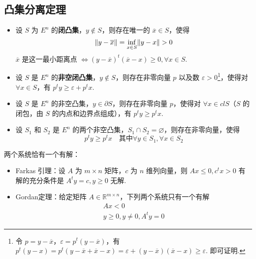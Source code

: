\subsection{凸集分离定理}
\begin{theorem}[凸集分离定理]
    \text{}
    \begin{itemize}
        \item 设 $S$ 为 $E^n$ 的\textbf{闭凸集}，$y\notin S$，则存在唯一的 $\overline{x} \in S$，使得\[ \norm{y - \overline{x}} = \underset{x \in S}{\inf} \norm{y - x} > 0 \]
        $\overline{x}$ 是这一最小距离点 $\Longleftrightarrow (y - \overline{x})^t(\overline{x} - x) \ge 0, \forall x \in S$.

        \item 设 $S$ 是 $E^n$ 的\textbf{非空闭凸集}，$y\notin S$，则存在非零向量 $p$ 以及数 $\varepsilon > 0$\footnote{令 $p = y - \overline{x}$，$\varepsilon = p^t(y - \overline{x})$，有 $p^t(y - x) = p^t(y - \overline{x} + \overline{x} - x) = \varepsilon + (y - \overline{x})(\overline{x} - x) \ge \varepsilon$. 即可证明.}，使得对 $\forall x \in S$，有 $p^t y \ge \varepsilon + p^t x$.
        
        \item 设 $S$ 是 $E^n$ 的非空凸集，$y\in \partial S$，则存在非零向量 $p$，使得对 $\forall x \in clS$（$S$ 的闭包，由 $S$ 的内点和边界点组成），有 $p^ty \ge p^tx$.
        
        \item 设 $S_1$ 和 $S_2$ 是 $E^n$ 的两个非空凸集，$S_1 \cap S_2 = \varnothing$，则存在非零向量，使得\[p^ty \ge p^t x \quad \text{其中}\forall y \in S_1, \forall x \in S_2\]
    \end{itemize}
\end{theorem}

\begin{theorem}
    两个系统恰有一个有解：
    \begin{itemize}
        \item Farkas 引理：设 $A$ 为 $m\times n$ 矩阵，$c$ 为 $n$ 维列向量，则 $Ax \le 0, c^tx > 0$ 有解的充分条件是 $A^ty = c, y\ge 0$ 无解.
        \item Gordan定理：给定矩阵 $A \in \mathbb{R}^{m\times n}$，下列两个系统只有一个有解
        \begin{gather*}
            Ax < 0\\
            y \ge 0, y \neq 0, A^ty = 0
        \end{gather*}
    \end{itemize}
\end{theorem}

